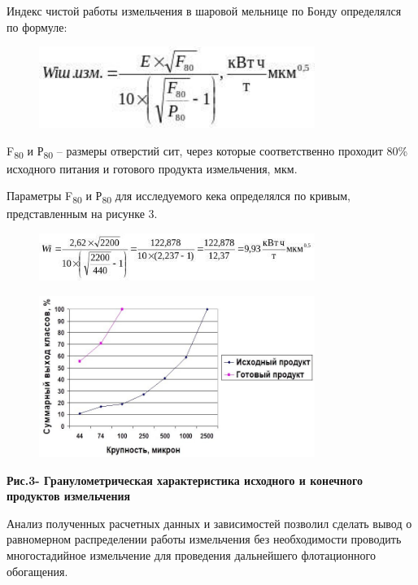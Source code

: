Индекс чистой работы измельчения в шаровой мельнице по Бонду определялся
по формуле:

\begin{figure}[H]
	\centering
	\includegraphics[width=0.8\textwidth]{assets/1040}
	\caption*{}
\end{figure}

F\textsubscript{80} и Р\textsubscript{80} -- размеры отверстий сит,
через которые соответственно проходит 80\% исходного питания и готового
продукта измельчения, мкм.

Параметры F\textsubscript{80} и Р\textsubscript{80} для исследуемого
кека определялся по кривым, представленным на рисунке 3.

\begin{figure}[H]
	\centering
	\includegraphics[width=0.8\textwidth]{assets/1041}
	\caption*{}
\end{figure}

\begin{figure}[H]
	\centering
	\includegraphics[width=0.8\textwidth]{assets/1042}
	\caption*{}
\end{figure}

{\bfseries Рис.3- Гранулометрическая характеристика исходного и конечного
продуктов измельчения}

Анализ полученных расчетных данных и зависимостей позволил сделать вывод
о равномерном распределении работы измельчения без необходимости
проводить многостадийное измельчение для проведения дальнейшего
флотационного обогащения.

